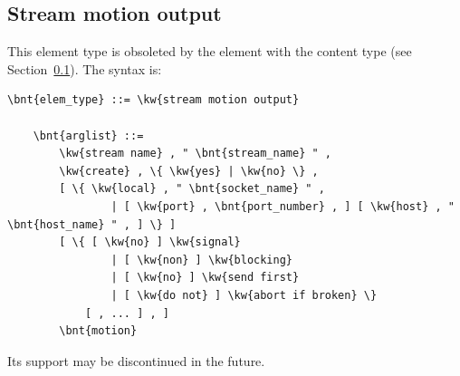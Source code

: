 \subsection{Stream motion output}\label{sec:EL:OUTELEM:STREAM_MOTION_OUTPUT}
This element type is obsoleted by the  element
with the  content type
(see Section~\ref{sec:EL:OUTELEM:STREAM_MOTION_OUTPUT}).
The syntax is:
\begin{Verbatim}[commandchars=\\\{\}]
    \bnt{elem_type} ::= \kw{stream motion output}

    \bnt{arglist} ::= 
        \kw{stream name} , " \bnt{stream_name} " ,
        \kw{create} , \{ \kw{yes} | \kw{no} \} ,
        [ \{ \kw{local} , " \bnt{socket_name} " ,
                | [ \kw{port} , \bnt{port_number} , ] [ \kw{host} , " \bnt{host_name} " , ] \} ]
        [ \{ [ \kw{no} ] \kw{signal}
                | [ \kw{non} ] \kw{blocking}
                | [ \kw{no} ] \kw{send first}
                | [ \kw{do not} ] \kw{abort if broken} \}
            [ , ... ] , ]
        \bnt{motion}
\end{Verbatim}
Its support may be discontinued in the future.



